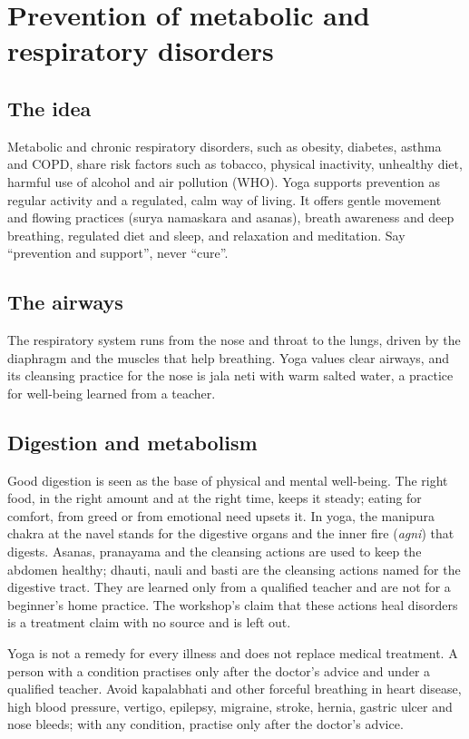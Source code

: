 \section{Prevention of metabolic and respiratory disorders}

\subsection*{The idea}
Metabolic and chronic respiratory disorders, such as obesity, diabetes, asthma and COPD, share risk factors such as tobacco, physical inactivity, unhealthy diet, harmful use of alcohol and air pollution (WHO). Yoga supports prevention as regular activity and a regulated, calm way of living. It offers gentle movement and flowing practices (surya namaskara and asanas), breath awareness and deep breathing, regulated diet and sleep, and relaxation and meditation. Say ``prevention and support'', never ``cure''.

\subsection*{The airways}
The respiratory system runs from the nose and throat to the lungs, driven by the diaphragm and the muscles that help breathing. Yoga values clear airways, and its cleansing practice for the nose is jala neti with warm salted water, a practice for well-being learned from a teacher.

\subsection*{Digestion and metabolism}
Good digestion is seen as the base of physical and mental well-being. The right food, in the right amount and at the right time, keeps it steady; eating for comfort, from greed or from emotional need upsets it. In yoga, the manipura chakra at the navel stands for the digestive organs and the inner fire (\emph{agni}) that digests. Asanas, pranayama and the cleansing actions are used to keep the abdomen healthy; dhauti, nauli and basti are the cleansing actions named for the digestive tract. They are learned only from a qualified teacher and are not for a beginner's home practice. The workshop's claim that these actions heal disorders is a treatment claim with no source and is left out.

\begin{caution}
Yoga is not a remedy for every illness and does not replace medical treatment. A person with a condition practises only after the doctor's advice and under a qualified teacher. Avoid kapalabhati and other forceful breathing in heart disease, high blood pressure, vertigo, epilepsy, migraine, stroke, hernia, gastric ulcer and nose bleeds; with any condition, practise only after the doctor's advice.
\end{caution}

